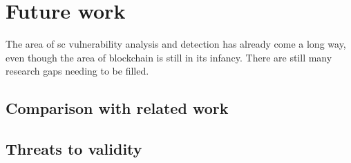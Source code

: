 \chapter{Future work}
\label{chap:future-work}

The area of \acrshort{sc} vulnerability analysis and detection has already come a long way, even though the area of blockchain is still in its infancy. There are still many research gaps needing to be filled.

\section{Comparison with related work}
\label{sec:comparison-with-related-work}

\section{Threats to validity}
\label{sec:threats-to-validity}